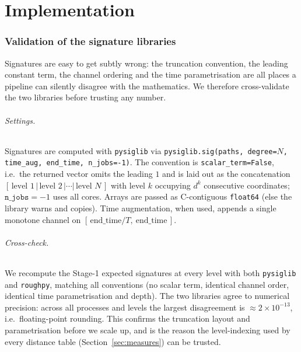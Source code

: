 \documentclass[11pt]{article}
\newcommand{\code}[1]{\texttt{#1}}
\begin{document}
\part{Implementation}

\section{Validation of the signature libraries}\label{sec:validation}
Signatures are easy to get subtly wrong: the truncation convention, the leading
constant term, the channel ordering and the time parametrisation are all places a
pipeline can silently disagree with the mathematics. We therefore cross-validate
the two libraries before trusting any number.

\paragraph{Settings.} Signatures are computed with \code{pysiglib} via
\code{pysiglib.sig(paths, degree=$N$, time\_aug, end\_time, n\_jobs=-1)}. The
convention is \code{scalar\_term=False}, i.e.\ the returned vector omits the leading
$1$ and is laid out as the concatenation
$[\,\text{level }1\,|\,\text{level }2\,|\cdots|\,\text{level }N\,]$ with level $k$
occupying $d^{k}$ consecutive coordinates; $\code{n\_jobs}=-1$ uses all cores.
Arrays are passed as C-contiguous \code{float64} (else the library warns and
copies). Time augmentation, when used, appends a single monotone channel on
$[\,\text{end\_time}/T,\ \text{end\_time}\,]$.

\paragraph{Cross-check.} We recompute the Stage-1 expected signatures at every
level with both \code{pysiglib} and \code{roughpy}, matching all conventions (no
scalar term, identical channel order, identical time parametrisation and depth).
The two libraries agree to numerical precision: across all processes and levels the
largest disagreement is $\approx 2\times10^{-13}$, i.e.\ floating-point rounding.
This confirms the truncation layout and parametrisation before we scale up, and is
the reason the level-indexing used by every distance table (Section~\ref{sec:measures})
can be trusted.
\end{document}
